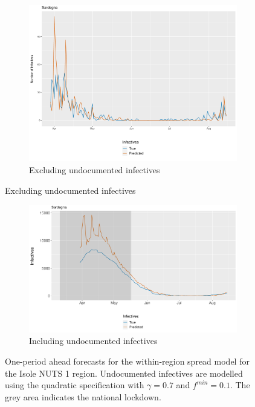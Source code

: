 \documentclass[12pt]{article}
\begin{document}
\begin{appendices}
		\begin{figure}[H]
    	    \centering
    	    \begin{subfigure}{\textwidth}
    	      \centering
    	      \includegraphics[width=0.94\linewidth]{output/model_within_lag14_forecast_start20_Isole_rolling.pdf}
    	      \caption{Excluding undocumented infectives}
    	      \label{fig:forecast_within_isole_regular}
    	    \end{subfigure}
        \end{figure}
        \begin{figure}[H]\ContinuedFloat
    	    \begin{subfigure}{\textwidth}
    	      \centering
    	      \includegraphics[width=0.94\linewidth]{output/model_within_lag14_forecast_start20_Isole_UndocQuadratic_rolling.pdf}
    	      \caption{Including undocumented infectives}
    	      \label{fig:forecast_within_isole_undoc}
    	    \end{subfigure}
    	    \caption{One-period ahead forecasts for the within-region spread model for the Isole NUTS 1 region. Undocumented infectives are modelled using the quadratic specification with $\gamma = 0.7$ and $f^{min}=0.1$. The grey area indicates the national lockdown.}
    	    \label{fig:forecast_within_isole}
        \end{figure}
		

\end{appendices}
\end{document}
